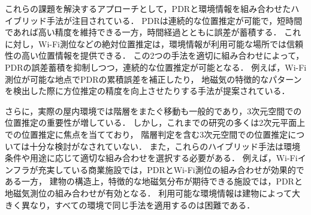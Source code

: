 これらの課題を解決するアプローチとして，PDRと環境情報を組み合わせたハイブリッド手法が注目されている．
PDRは連続的な位置推定が可能で，短時間であれば高い精度を維持できる一方，時間経過とともに誤差が蓄積する．
これに対し，Wi-Fi測位などの絶対位置推定は，環境情報が利用可能な場所では信頼性の高い位置情報を提供できる．
この2つの手法を適切に組み合わせによって，PDRの誤差蓄積を抑制しつつ，連続的な位置推定が可能となる．
例えば，Wi-Fi測位が可能な地点でPDRの累積誤差を補正したり，
地磁気の特徴的なパターンを検出した際に方位推定の精度を向上させたりする手法が提案されている．

さらに，実際の屋内環境では階層をまたぐ移動も一般的であり，3次元空間での位置推定の重要性が増している．
しかし，これまでの研究の多くは2次元平面上での位置推定に焦点を当てており，
階層判定を含む3次元空間での位置推定については十分な検討がなされていない．
また，これらのハイブリッド手法は環境条件や用途に応じて適切な組み合わせを選択する必要がある．
例えば，Wi-Fiインフラが充実している商業施設では，PDRとWi-Fi測位の組み合わせが効果的である一方，
建物の構造上，特徴的な地磁気分布が期待できる施設では，PDRと地磁気測位の組み合わせが有効となる．
利用可能な環境情報は建物によって大きく異なり，すべての環境で同じ手法を適用するのは困難である．






